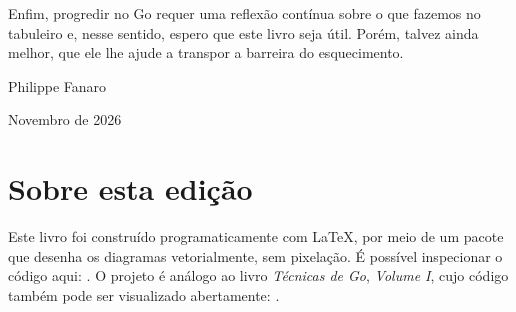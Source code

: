 Enfim, progredir no Go requer uma reflexão contínua sobre o que fazemos no tabuleiro e, nesse sentido, espero que este livro seja útil. Porém, talvez ainda melhor, que ele lhe ajude a transpor a barreira do esquecimento.

\bigskip
\bigskip

\hspace*{\fill} Philippe Fanaro

\hspace*{\fill} Novembro de 2026

\pagebreak

\section*{Sobre esta edição}

Este livro foi construído programaticamente com \LaTeX, por meio de um pacote que desenha os diagramas vetorialmente, sem pixelação. É possível inspecionar o código aqui: \href{https://github.com/psygo/tsumego\_workbooks}{}. O projeto é análogo ao livro \textit{Técnicas de Go}, \textit{Volume I}, cujo código também pode ser visualizado abertamente: \href{https://github.com/psygo/tecnicas\_de\_go}{}.
